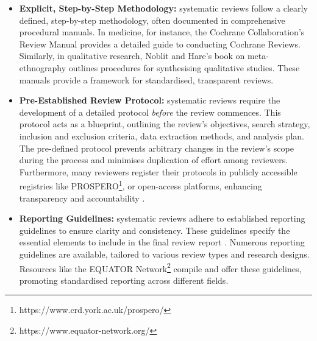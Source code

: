 \documentclass[10pt,oneside]{book}
\begin{document}
\begin{itemize}
    \item {\bf{Explicit, Step-by-Step Methodology:}} systematic reviews follow a clearly defined, step-by-step methodology, often documented in comprehensive procedural manuals. In medicine, for instance, the Cochrane Collaboration's Review Manual \cite{lefebvre_cochrane_2011} provides a detailed guide to conducting Cochrane Reviews. Similarly, in qualitative research, Noblit and Hare's book on meta-ethnography \cite{noblit_meta-ethnography_1988} outlines procedures for synthesising qualitative studies. These manuals provide a framework for standardised, transparent reviews.
    \item {\bf{Pre-Established Review Protocol:}} systematic reviews require the development of a detailed protocol {\it{before}} the review commences. This protocol acts as a blueprint, outlining the review's objectives, search strategy, inclusion and exclusion criteria, data extraction methods, and analysis plan. The pre-defined protocol prevents arbitrary changes in the review's scope during the process and minimises duplication of effort among reviewers. Furthermore, many reviewers register their protocols in publicly accessible registries like PROSPERO\footnote{https://www.crd.york.ac.uk/prospero/}, or open-access platforms, enhancing transparency and accountability \cite{tawfik_protocol_2020}.
    \item {\bf{Reporting Guidelines:}} systematic reviews adhere to established reporting guidelines to ensure clarity and consistency. These guidelines specify the essential elements to include in the final review report \cite{moher_preferred_2010}. Numerous reporting guidelines are available, tailored to various review types and research designs. Resources like the EQUATOR Network\footnote{https://www.equator-network.org/} compile and offer these guidelines, promoting standardised reporting across different fields.
    

\end{itemize}
\end{document}
